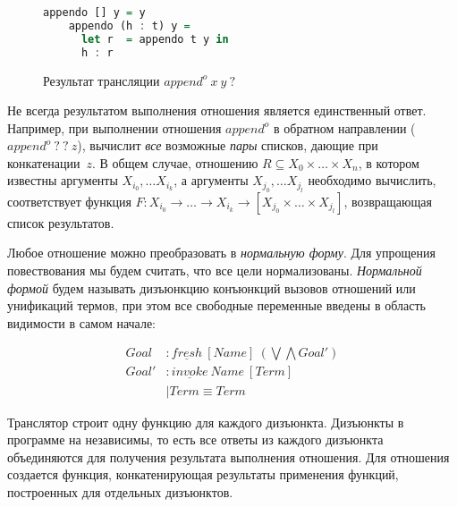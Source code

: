 \documentclass[conference,american,russian]{IEEEtran}
\begin{document}
\begin{figure}[ht!]
  \centering
  \begin{lstlisting}[language=Haskell, frame=single]
    appendo [] y = y
    appendo (h : t) y =
      let r  = appendo t y in 
      h : r 
  \end{lstlisting}
  \caption{Результат трансляции $append^o \ x \ y \ ?$}
  \label{lst:appendoFWD}
\end{figure}

Не всегда результатом выполнения отношения является единственный ответ.
Например, при выполнении отношения $append^o$ в обратном направлении ($append^o \ ? \ ? \ z$), \miniKanren{} вычислит \emph{все} возможные \emph{пары} списков, дающие при конкатенации~$z$. 
В общем случае, отношению $R \subseteq X_0 \times \dots \times X_n$, в котором известны аргументы $X_{i_0}, \dots X_{i_k}$, а аргументы $X_{j_0}, \dots X_{j_l}$ необходимо вычислить, соответствует функция $F : X_{i_0} \to \dots \to X_{i_k} \to [X_{j_0} \times \dots \times X_{j_l}]$, возвращающая список результатов. 

Любое отношение можно преобразовать в \emph{нормальную форму}. 
Для упрощения повествования мы будем считать, что все цели нормализованы. 
\emph{Нормальной формой} будем называть дизъюнкцию конъюнкций вызовов отношений или унификаций термов, при этом все свободные переменные введены в область видимости в самом начале:

\begin{align*}
  Goal  &: \underline{fresh} \ [Name] \ (\bigvee \bigwedge Goal') \\
  Goal' &: \underline{invoke} \ Name \ [Term] \\
        &\mid Term \equiv Term 
\end{align*}

Транслятор строит одну функцию для каждого дизъюнкта. 
Дизъюнкты в программе на \miniKanren{} независимы, то есть все ответы из каждого дизъюнкта объединяются для получения результата выполнения отношения. 
Для отношения создается функция, конкатенирующая результаты применения функций, построенных для отдельных дизъюнктов. 





\end{document}
